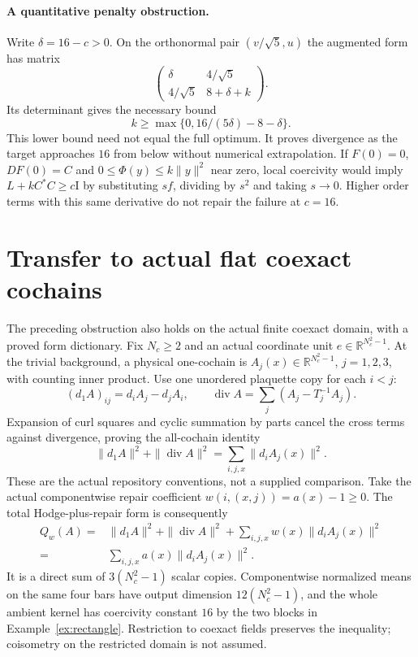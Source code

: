 \documentclass[11pt,a4paper]{article}
\newcommand{\R}{\mathbb R}
\newcommand{\id}{\mathrm I}
\begin{document}
\paragraph{A quantitative penalty obstruction.}
Write $\delta=16-c>0$. On the orthonormal pair $(v/\sqrt5,u)$ the
augmented form has matrix
\[
 \begin{pmatrix}\delta&4/\sqrt5\\4/\sqrt5&8+\delta+k\end{pmatrix}.
\]
Its determinant gives the necessary bound
\begin{equation}\label{eq:blowup}
 k\geq\max\{0,16/(5\delta)-8-\delta\}.
\end{equation}
This lower bound need not equal the full optimum. It proves divergence
as the target approaches $16$ from below without numerical extrapolation.
If $F(0)=0$, $DF(0)=C$ and $0\leq\Phi(y)\leq k\|y\|^2$ near zero,
local coercivity would imply $L+kC^*C\geq c\id$ by substituting $sf$,
dividing by $s^2$ and taking $s\to0$. Higher order terms with this same
derivative do not repair the failure at $c=16$.

\section{Transfer to actual flat coexact cochains}
The preceding obstruction also holds on the actual finite coexact domain,
with a proved form dictionary. Fix $N_c\geq2$ and an actual coordinate unit
$e\in\R^{N_c^2-1}$. At the trivial background, a physical one-cochain is
$A_j(x)\in\R^{N_c^2-1}$, $j=1,2,3$, with counting inner product. Use one
unordered plaquette copy for each $i<j$:
\[
 (d_1 A)_{ij}=d_iA_j-d_jA_i,\qquad
 \operatorname{div}A=\sum_j(A_j-T_j^{-1}A_j).
\]
Expansion of curl squares and cyclic summation by parts cancel the cross
terms against divergence, proving the all-cochain identity
\[
 \|d_1A\|^2+\|\operatorname{div}A\|^2=\sum_{i,j,x}\|d_iA_j(x)\|^2.
\]
These are the actual repository conventions, not a supplied comparison.
Take the actual componentwise repair coefficient $w(i,(x,j))=a(x)-1\geq0$.
The total Hodge-plus-repair form is consequently
\begin{equation}\label{eq:physical-dictionary}
 \begin{aligned} Q_w(A)={}&\|d_1A\|^2+\|\operatorname{div}A\|^2+
 \sum_{i,j,x}w(x)\|d_iA_j(x)\|^2
 \\ ={}&\sum_{i,j,x}a(x)\|d_iA_j(x)\|^2. \end{aligned}
\end{equation}
It is a direct sum of $3(N_c^2-1)$ scalar copies. Componentwise normalized
means on the same four bars have output dimension $12(N_c^2-1)$, and
the whole ambient kernel has coercivity constant $16$ by the two blocks
in Example~\ref{ex:rectangle}. Restriction to coexact fields preserves the
inequality; coisometry on the restricted domain is not assumed.
\end{document}
